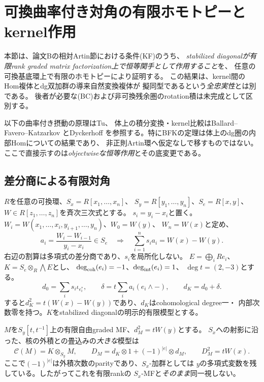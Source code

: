 \section{可換曲率付き対角の有限ホモトピーとkernel作用}\label{dki:sec:identity}

本節は、論文Bの相対Artin節における条件(KF)のうち、
\emph{stabilized diagonalが有限rank graded matrix factorization上で恒等関手として作用すること}を、
任意の可換基底環上で有限のホモトピーにより証明する。
この結果は、kernel間のHom複体とdg双加群の導来自然変換複体が
擬同型であるという\emph{全忠実性}とは別である。
後者が必要な(BC)および非可換残余圏のrotation積は未完成として区別する。

以下の曲率付き摂動の原理はTu\cite[Appendix~A, Lemma~A.1]{DKITu}、
体上の積分変換・kernel比較はBallard--Favero--Katzarkov
\cite[Theorem~5.22]{DKIBFK}とDyckerhoff\cite[Section~5]{DKIDyckerhoff}
を参照する。特にBFKの定理は体上のdg圏の内部Homについての結果であり、
非正則Artin環へ仮定なしで移すものではない。
ここで直接示すのは\emph{objectwiseな恒等作用}とその底変更である。

\subsection{差分商による有限対角}

$R$を任意の可換環、$S_x=R[x_1,\ldots,x_n]$、
$S_y=R[y_1,\ldots,y_n]$、$S_e=R[x,y]$、
$W\in R[z_1,\ldots,z_n]$を斉次三次式とする。
$s_i=y_i-x_i$と置く。
$W_i=W(x_1,\ldots,x_i,y_{i+1},\ldots,y_n)$、$W_0=W(y)$、
$W_n=W(x)$と定め、
\begin{equation}
 a_i=\frac{W_i-W_{i-1}}{y_i-x_i}\in S_e
 \quad\Longrightarrow\quad
 \sum_{i=1}^n s_i a_i=W(x)-W(y).
 \tag{DKI1}\label{dki:eq:diff}
\end{equation}
右辺の割算は多項式の差分商であり、$s_i$を局所化しない。
$E=\bigoplus_iRe_i$、$K=S_e\otimes_R\bigwedge E$とし、
$\deg_{\rm coh}(e_i)=-1$、$\deg_{\rm int}(e_i)=1$、
$\deg t=(2,-3)$とする。
\begin{equation}
 d_0=\sum_i s_i\iota_{e_i^*},\qquad
 \delta=t\sum_i a_i(e_i\wedge-),\qquad
 d_K=d_0+\delta.
 \tag{DKI2}\label{dki:eq:koszul}
\end{equation}
すると$d_K^2=t(W(x)-W(y))$であり、$d_K$はcohomological degree一・
内部次数零を持つ。$K$をstabilized diagonalの明示的有限模型とする。

$M$を$S_y[t,t^{-1}]$上の有限自由graded MF、$d_M^2=tW(y)$とする。
$S_x$への射影に沿った、核の外積との畳込みの\emph{大きな}模型は
\begin{equation}
 \mathscr C(M)=K\otimes_{S_y}M,
 \qquad D_M=d_K\otimes1+(-1)^{|e|}\otimes d_M,
 \qquad D_M^2=tW(x).
 \tag{DKI3}\label{dki:eq:convolution}
\end{equation}
ここで$(-1)^{|e|}$は外積次数のparityであり、$S_x$-加群としては
$y$の多項式変数を残している。したがってこれを有限rankの
$S_x$-MFと\emph{そのまま}同一視しない。

